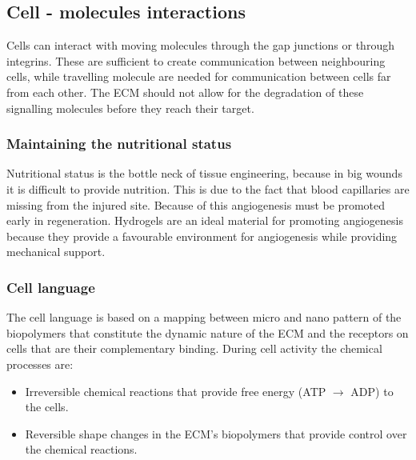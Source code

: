 	\subsection{Cell - molecules interactions}
	Cells can interact with moving molecules through the gap junctions or through integrins.
	These are sufficient to create communication between neighbouring cells, while travelling molecule are needed for communication between cells far from each other.
	The ECM should not allow for the degradation of these signalling molecules before they reach their target.

		\subsubsection{Maintaining the nutritional status}
		Nutritional status is the bottle neck of tissue engineering, because in big wounds it is difficult to provide nutrition.
		This is due to the fact that blood capillaries are missing from the injured site.
		Because of this angiogenesis must be promoted early in regeneration.
		Hydrogels are an ideal material for promoting angiogenesis because they provide a favourable environment for angiogenesis while providing mechanical support.

		\subsubsection{Cell language}
		The cell language is based on a mapping between micro and nano pattern of the biopolymers that constitute the dynamic nature of the ECM and the receptors on cells that are their complementary binding.
		During cell activity the chemical processes are:

		\begin{multicols}{2}
			\begin{itemize}
				\item Irreversible chemical reactions that provide free energy (ATP $\rightarrow$ ADP) to the cells.
				\item Reversible shape changes in the ECM's biopolymers that provide control over the chemical reactions.
			\end{itemize}
		\end{multicols}

